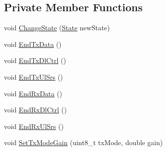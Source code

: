 \subsection*{Private Member Functions}
\begin{DoxyCompactItemize}
\item 
void \hyperlink{classns3_1_1LteSpectrumPhy_a64a105b7c580b3d6dc5cd4b97d1223d9}{Change\+State} (\hyperlink{classns3_1_1LteSpectrumPhy_a52ce2cf9b4846807449c50399f6b8000}{State} new\+State)
\item 
void \hyperlink{classns3_1_1LteSpectrumPhy_a52f289e3692bf79dfe70d93c70e248fd}{End\+Tx\+Data} ()
\item 
void \hyperlink{classns3_1_1LteSpectrumPhy_acc36ac9ddcc5daff49b55f106b97856c}{End\+Tx\+Dl\+Ctrl} ()
\item 
void \hyperlink{classns3_1_1LteSpectrumPhy_a7d2b8ee31f4ba86eb824da94fd2f6a34}{End\+Tx\+Ul\+Srs} ()
\item 
void \hyperlink{classns3_1_1LteSpectrumPhy_adb0ef7ffaee60976d3b79f31fb3129ca}{End\+Rx\+Data} ()
\item 
void \hyperlink{classns3_1_1LteSpectrumPhy_a88ff185754afa38f1bceb9f1641bdabc}{End\+Rx\+Dl\+Ctrl} ()
\item 
void \hyperlink{classns3_1_1LteSpectrumPhy_a71a205152af503902cd05d2f31f55227}{End\+Rx\+Ul\+Srs} ()
\item 
void \hyperlink{classns3_1_1LteSpectrumPhy_a6522a151e5d597a3ffb63c9052f34a40}{Set\+Tx\+Mode\+Gain} (uint8\+\_\+t tx\+Mode, double gain)
\end{DoxyCompactItemize}
